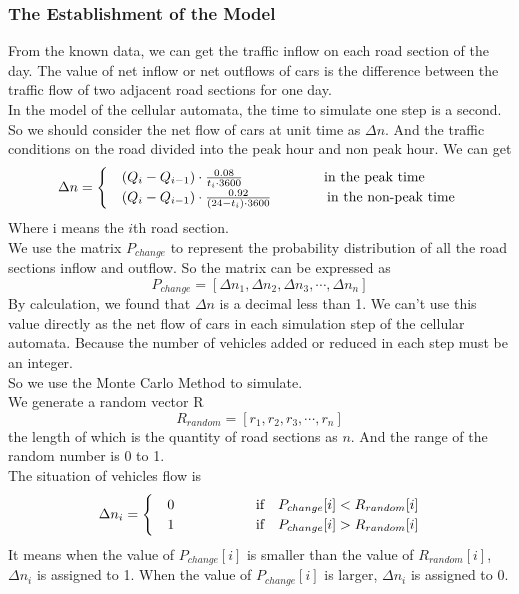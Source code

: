 \documentclass{mcmthesis}
\begin{document}
\subsubsection{The Establishment of the Model}
\indent From the known data, we can get the traffic inflow on each road section of the day. The value of net inflow or net outflows of cars is the difference between the traffic flow of two adjacent road sections for one day.\\
\indent In the model of the cellular automata, the time to simulate one step is a second. So we should consider the net flow of cars at unit time as $\Delta n$. And the traffic conditions on the road divided into the peak hour and non peak hour. We can get
\begin{equation}
	\Delta n=\begin{cases}
	&(Q_{i}-Q_{i-1})\cdot \frac{0.08}{t_{i}\cdot 3600} \indent\indent \indent\quad\text{\,\,in the peak time }\\ 
	&(Q_{i}-Q_{i-1})\cdot \frac{0.92}{(24-t_{i})\cdot 3600}\indent\indent \quad\text{in the non-peak time } 
	\end{cases}
\end{equation}
\indent Where i means the $i$th road section. \\
\indent We use the matrix $P_{change}$ to represent the probability distribution of all the road sections inflow and outflow. So the matrix can be expressed as
\begin{equation}
	P_{change}=[\Delta n_1, \Delta n_2,\Delta n_3,\cdots, \Delta n_n]
\end{equation}
\indent By calculation, we found that $\Delta n$ is a decimal less than 1. We can't use this value directly as the net flow of cars in each simulation step of the cellular automata. Because the number of vehicles added or reduced in each step must be an integer.\\
\indent So we use the Monte Carlo Method to simulate.\\
\indent We generate a random vector R\\
\begin{equation}
	R_{random}=[r_1, r_2,r_3,\cdots, r_n]
\end{equation}
\indent the length of which is the quantity of road sections as $n$. And the range of the random number is 0 to 1.\\
\indent The situation of vehicles flow is 
\begin{equation}
	\Delta n_{i}=\begin{cases}
	&0 \indent\indent\indent \quad\text{\,\,if \,\, $P_{change}[i] < R_{random}[i]$}\\ 
	&1 \indent\indent\indent \quad\text{\,\,if \,\, $P_{change}[i] > R_{random}[i]$} 
	\end{cases}
\end{equation}
\indent It means when the value of $P_{change}[i]$ is smaller than the value of $R_{random}[i]$, $\Delta n_{i}$ is assigned to 1. When the value of $P_{change}[i]$ is larger,  $\Delta n_{i}$ is assigned to 0.
\end{document}

